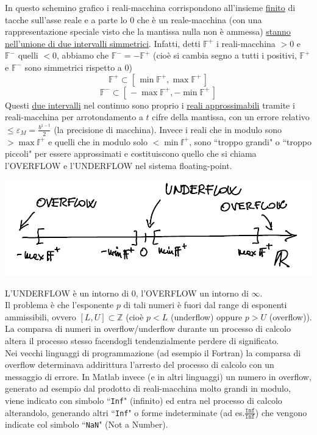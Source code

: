 In questo schemino grafico i reali-macchina corrispondono all'insieme \uline{finito} di tacche sull'asse reale e a parte lo 0 che è un reale-macchina (con una rappresentazione speciale visto che la mantissa nulla non è ammessa) \uline{stanno nell'unione di due intervalli simmetrici}. Infatti, detti $\mathbb{F}^+$ i reali-macchina $>0$ e $\mathbb{F}^-$ quelli $<0$, abbiamo che $\mathbb{F}^- = - \mathbb{F}^+$ (cioè si cambia segno a tutti i positivi, $\mathbb{F}^+$ e $\mathbb{F}^-$ sono simmetrici rispetto a 0) 
\[ \mathbb{F}^+ \subset [\,\min \mathbb{F}^+, \max \mathbb{F}^+\,] \]
\[ \mathbb{F}^- \subset [\,- \max \mathbb{F}^+, - \min \mathbb{F}^+\,] \]
Questi \uline{due intervalli} nel continuo sono proprio i \uline{reali approssimabili} tramite i reali-macchina per arrotondamento a $t$ cifre della mantissa, con un errore relativo $\le \varepsilon_M = \frac{b^{1-t}}{2}$ (la precisione di macchina). Invece i reali che in modulo sono $> \max \mathbb{f}^+$ e quelli che in modulo solo $< \min \mathbb{f}^+$, sono ``troppo grandi" o ``troppo piccoli" per essere approssimati e costituiscono quello che si chiama l'OVERFLOW e l'UNDERFLOW nel sistema floating-point.\begin{center}
    \includegraphics[scale=0.65]{foto/img3}
\end{center}
L'UNDERFLOW è un intorno di 0, l'OVERFLOW un intorno di $\infty$.\\
Il problema è che l'esponente $p$ di tali numeri è fuori dal range di esponenti ammissibili, ovvero $[L,U] \subset \mathbb{Z}$ (cioè $p < L$ (underflow) oppure $p > U$ (overflow)).\\
La comparsa di numeri in overflow/underflow durante un processo di calcolo altera il processo stesso facendogli tendenzialmente perdere di significato. \\
Nei vecchi linguaggi di programmazione (ad esempio il Fortran) la comparsa di overflow determinava addirittura l'arresto del processo di calcolo con un messaggio di errore. In Matlab invece (e in altri linguaggi) un numero in overflow, generato ad esempio dal prodotto di reali-macchina molto grandi in modulo, viene indicato con simbolo ``\texttt{Inf}" (infinito) ed entra nel processo di calcolo alterandolo, generando altri ``\texttt{Inf}" o forme indeterminate (ad es.$\frac{\texttt{Inf}}{\texttt{Inf}}$) che vengono indicate col simbolo ``\texttt{NaN}" (Not a Number).\\
